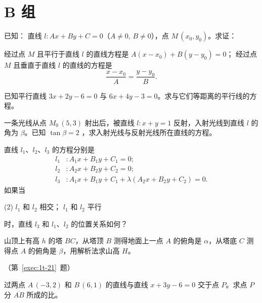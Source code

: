\section*{B 组}
\begin{question}[resume]
  \item 已知： 直线 $l:Ax+By+C=0$（$A\neq 0,\,B\neq 0$），点 $M\,(x_0,y_0)$。求证：
  \begin{tasks}
    \task 经过点 $M$ 且平行于直线 $l$ 的直线方程是 $A(x-x_0)+B(y-y_0)=0$；
    \task 经过点 $M$ 且垂直于直线 $l$ 的直线的方程是 \[\frac{x-x_0}{A}=\frac{y-y_0}{B}.\]
  \end{tasks}
  \item 已知平行直线 $3x+2y-6=0$ 与 $6x+4y-3=0$。求与它们等距离的平行线的方程。
  \item 一条光线从点 $M_0\,(5,3)$ 射出后，被直线 $l:x+y=1$ 反射，入射光线到直线 $l$ 的角为 $\beta$。已知 $\tan\beta = 2$ ，求入射光线与反射光线所在直线的方程。
  \item 直线 $l_1$、$l_2$、$l_3$ 的方程分别是
  \begin{align*}
    l_1 &: A_1x+B_1y+C_1 =0; \\
    l_2 &: A_2x+B_2y+C_2 =0; \\
    l_3 &: A_1x+B_1y+C_1 + \lambda(A_2x+B_2y+C_2) =0. 
  \end{align*}
  如果当 
  \begin{tasks}(2)
    \task $l_1$ 和 $l_2$ 相交；
    \task $l_1$ 和 $l_2$ 平行
  \end{tasks}
  时，直线 $l_3$ 和 $l_1$、$l_2$ 的位置关系如何？
  \item\label{exec:1t-21} 山顶上有高 $h$ 的塔 $BC$，从塔顶 $B$ 测得地面上一点 $A$ 的俯角是 $\alpha$，从塔底 $C$ 测得点 $A$ 的俯角是 $\beta$，用解析法求山高 $H$。
  \begin{figurehere}
    \begin{minipage}{\linewidth}\centering
    \caption*{（第~\ref{exec:1t-21}~题）}
    \end{minipage}
  \end{figurehere}
  \item 过两点 $A\,(-3,2)$ 和 $B\,(6,1)$ 的直线与直线 $x+3y-6=0$ 交于点 $P$。求点 $P$ 分 $\overline{AB}$ 所成的比。
\end{question}
